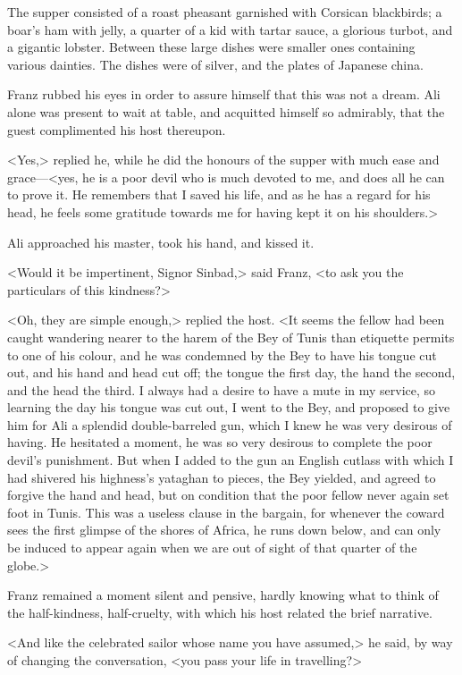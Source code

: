  The supper consisted of a roast pheasant garnished with Corsican blackbirds; a boar's ham with jelly, a quarter of a kid with tartar sauce, a glorious turbot, and a gigantic lobster. Between these large dishes were smaller ones containing various dainties. The dishes were of silver, and the plates of Japanese china. 

 Franz rubbed his eyes in order to assure himself that this was not a dream. Ali alone was present to wait at table, and acquitted himself so admirably, that the guest complimented his host thereupon. 

 <Yes,> replied he, while he did the honours of the supper with much ease and grace—<yes, he is a poor devil who is much devoted to me, and does all he can to prove it. He remembers that I saved his life, and as he has a regard for his head, he feels some gratitude towards me for having kept it on his shoulders.> 

 Ali approached his master, took his hand, and kissed it. 

 <Would it be impertinent, Signor Sinbad,> said Franz, <to ask you the particulars of this kindness?>

<Oh, they are simple enough,> replied the host. <It seems the fellow had been caught wandering nearer to the harem of the Bey of Tunis than etiquette permits to one of his colour, and he was condemned by the Bey to have his tongue cut out, and his hand and head cut off; the tongue the first day, the hand the second, and the head the third. I always had a desire to have a mute in my service, so learning the day his tongue was cut out, I went to the Bey, and proposed to give him for Ali a splendid double-barreled gun, which I knew he was very desirous of having. He hesitated a moment, he was so very desirous to complete the poor devil's punishment. But when I added to the gun an English cutlass with which I had shivered his highness's yataghan to pieces, the Bey yielded, and agreed to forgive the hand and head, but on condition that the poor fellow never again set foot in Tunis. This was a useless clause in the bargain, for whenever the coward sees the first glimpse of the shores of Africa, he runs down below, and can only be induced to appear again when we are out of sight of that quarter of the globe.> 

 Franz remained a moment silent and pensive, hardly knowing what to think of the half-kindness, half-cruelty, with which his host related the brief narrative. 

 <And like the celebrated sailor whose name you have assumed,> he said, by way of changing the conversation, <you pass your life in travelling?> 

